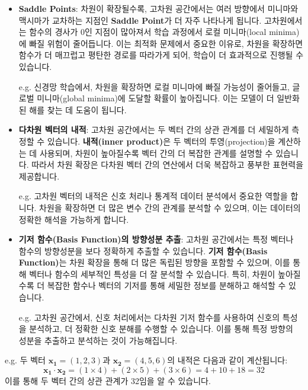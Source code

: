 \begin{itemize}
  \item \textbf{Saddle Points}: 차원이 확장될수록, 고차원 공간에서는 여러 방향에서 미니마와 맥시마가 교차하는 지점인 \textbf{Saddle Point}가 더 자주 나타나게 됩니다. 고차원에서는 함수의 경사가 0인 지점이 많아져서 학습 과정에서 로컬 미니마(local minima)에 빠질 위험이 줄어듭니다. 이는 최적화 문제에서 중요한 이유로, 차원을 확장하면 함수가 더 매끄럽고 평탄한 경로를 따라가게 되어, 학습이 더 효과적으로 진행될 수 있습니다.

        \vspace{1\baselineskip}
        \noindent {} e.g. 신경망 학습에서, 차원을 확장하면 로컬 미니마에 빠질 가능성이 줄어들고, 글로벌 미니마(global minima)에 도달할 확률이 높아집니다. 이는 모델이 더 일반화된 해를 찾는 데 도움이 됩니다.

  \item \textbf{다차원 벡터의 내적}: 고차원 공간에서는 두 벡터 간의 상관 관계를 더 세밀하게 측정할 수 있습니다. \textbf{내적(inner product)}은 두 벡터의 투영(projection)을 계산하는 데 사용되며, 차원이 높아질수록 벡터 간의 더 복잡한 관계를 설명할 수 있습니다. 따라서 차원 확장은 다차원 벡터 간의 연산에서 더욱 복잡하고 풍부한 표현력을 제공합니다.

        \vspace{1\baselineskip}
        \noindent {} e.g. 고차원 벡터의 내적은 신호 처리나 통계적 데이터 분석에서 중요한 역할을 합니다. 차원을 확장하면 더 많은 변수 간의 관계를 분석할 수 있으며, 이는 데이터의 정확한 해석을 가능하게 합니다.

  \item \textbf{기저 함수(Basis Function)의 방향성분 추출}: 고차원 공간에서는 특정 벡터나 함수의 방향성분을 보다 정확하게 추출할 수 있습니다. \textbf{기저 함수(Basis Function)}는 차원 확장을 통해 더 많은 독립된 방향을 포함할 수 있으며, 이를 통해 벡터나 함수의 세부적인 특성을 더 잘 분석할 수 있습니다. 특히, 차원이 높아질수록 더 복잡한 함수나 벡터의 기저를 통해 세밀한 정보를 분해하고 해석할 수 있습니다.

        \vspace{1\baselineskip}
        \noindent {} e.g. 고차원 공간에서, 신호 처리에서는 다차원 기저 함수를 사용하여 신호의 특성을 분석하고, 더 정확한 신호 분해를 수행할 수 있습니다. 이를 통해 특정 방향의 성분을 추출하고 분석하는 것이 가능해집니다.
\end{itemize}



\vspace{1\baselineskip}
\noindent {} e.g. 두 벡터 \( \mathbf{x_1} = (1, 2, 3) \)과 \( \mathbf{x_2} = (4, 5, 6) \)의 내적은 다음과 같이 계산됩니다:
\[
  \mathbf{x_1} \cdot \mathbf{x_2} = (1 \times 4) + (2 \times 5) + (3 \times 6) = 4 + 10 + 18 = 32
\]
이를 통해 두 벡터 간의 상관 관계가 32임을 알 수 있습니다.

